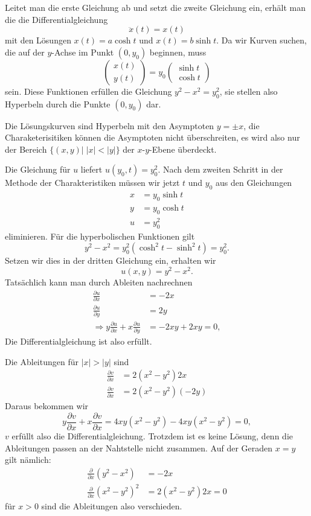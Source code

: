 \begin{loesung}
\begin{teilaufgaben}
Leitet man die erste
Gleichung ab und setzt die zweite Gleichung ein, erhält man die
die Differentialgleichung
\[
\ddot x(t)=x(t)
\]
mit den Lösungen $x(t)=a\cosh t$ und $x(t)=b\sinh t$.
Da wir Kurven
suchen, die auf der $y$-Achse im Punkt $(0,y_0)$ beginnen, muss
\[
\begin{pmatrix}
x(t)\\y(t)
\end{pmatrix}
=
y_0
\begin{pmatrix}
\sinh t\\
\cosh t
\end{pmatrix}
\]
sein.
Diese Funktionen erfüllen die Gleichung $y^2-x^2=y_0^2$, sie stellen
also Hyperbeln durch die Punkte $(0,y_0)$ dar.
\item
Die Lösungskurven sind Hyperbeln mit den Asymptoten $y=\pm x$, die
Charaketerisitiken können die Asymptoten nicht überschreiten, es wird
also nur der Bereich $\{(x,y)|\;|x|<|y|\}$ der $x$-$y$-Ebene überdeckt.
\item
Die Gleichung für $u$ liefert $u(y_0, t)=y_0^2$.
Nach dem zweiten Schritt in der Methode der Charakteristiken
müssen wir jetzt $t$ und $y_0$ aus den Gleichungen
\begin{align*}
x&=y_0\sinh t\\
y&=y_0\cosh t\\
u&=y_0^2
\end{align*}
eliminieren. Für die hyperbolischen Funktionen gilt
\[
y^2-x^2=y_0^2(\cosh^2t-\sinh^2t)=y_0^2.
\]
Setzen wir dies in der dritten Gleichung ein, erhalten wir
\[
u(x,y)=y^2-x^2.
\]
Tatsächlich kann man durch Ableiten nachrechnen
\begin{align*}
\frac{\partial u}{\partial x}&=-2x\\
\frac{\partial u}{\partial y}&=2y\\
\Rightarrow
y\frac{\partial u}{\partial x}+x\frac{\partial u}{\partial y}&=-2xy+2xy=0,
\end{align*}
Die Differentialgleichung ist also erfüllt.
\item
Die Ableitungen für $|x|>|y|$ sind
\begin{align*}
\frac{\partial v}{\partial x}
&=2(x^2-y^2)2x\\
\frac{\partial v}{\partial x}
&=2(x^2-y^2)(-2y)
\end{align*}
Daraus bekommen wir
\[
y\frac{\partial v}{\partial x}
+
x \frac{\partial v}{\partial x}
=
4xy(x^2-y^2)
-4xy(x^2-y^2)=0,
\]
$v$ erfüllt also die Differentialgleichung.
Trotzdem ist es keine
Lösung, denn die Ableitungen passen an der Nahtstelle nicht zusammen.
Auf der Geraden $x=y$ gilt nämlich:
\begin{align*}
\frac{\partial}{\partial x}(y^2-x^2)&=-2x\\
\frac{\partial}{\partial x}(x^2-y^2)^2&=2(x^2-y^2)2x=0
\end{align*}
für $x>0$ sind die Ableitungen also verschieden.
\end{teilaufgaben}


\end{loesung}
